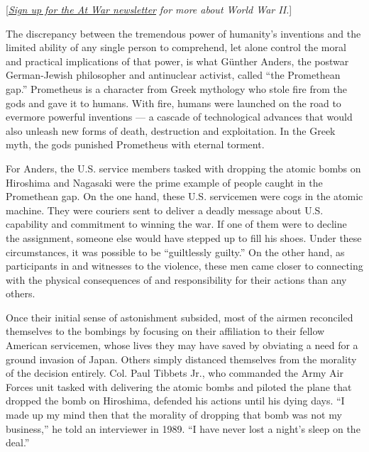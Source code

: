 {[}\href{https://www.nytimes.com/newsletters/at-war?module=inline}{\emph{Sign
up for the At War newsletter}} \emph{for more about World War II.}{]}

The discrepancy between the tremendous power of humanity's inventions
and the limited ability of any single person to comprehend, let alone
control the moral and practical implications of that power, is what
Günther Anders, the postwar German-Jewish philosopher and antinuclear
activist, called ``the Promethean gap.'' Prometheus is a character from
Greek mythology who stole fire from the gods and gave it to humans. With
fire, humans were launched on the road to evermore powerful inventions
--- a cascade of technological advances that would also unleash new
forms of death, destruction and exploitation. In the Greek myth, the
gods punished Prometheus with eternal torment.

For Anders, the U.S. service members tasked with dropping the atomic
bombs on Hiroshima and Nagasaki were the prime example of people caught
in the Promethean gap. On the one hand, these U.S. servicemen were cogs
in the atomic machine. They were couriers sent to deliver a deadly
message about U.S. capability and commitment to winning the war. If one
of them were to decline the assignment, someone else would have stepped
up to fill his shoes. Under these circumstances, it was possible to be
``guiltlessly guilty.'' On the other hand, as participants in and
witnesses to the violence, these men came closer to connecting with the
physical consequences of and responsibility for their actions than any
others.

Once their initial sense of astonishment subsided, most of the airmen
reconciled themselves to the bombings by focusing on their affiliation
to their fellow American servicemen, whose lives they may have saved by
obviating a need for a ground invasion of Japan. Others simply distanced
themselves from the morality of the decision entirely. Col. Paul Tibbets
Jr., who commanded the Army Air Forces unit tasked with delivering the
atomic bombs and piloted the plane that dropped the bomb on Hiroshima,
defended his actions until his dying days. ``I made up my mind then that
the morality of dropping that bomb was not my business,'' he told an
interviewer in 1989. ``I have never lost a night's sleep on the deal.''

